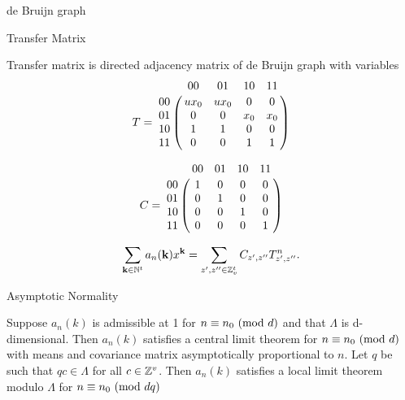   \begin{frame}{de Bruijn graph}
    \usetikzlibrary {arrows.meta}
    \begin{center}
    \end{center}

  \end{frame}

  \begin{frame}{Transfer Matrix}


    
    Transfer matrix is directed adjacency matrix of de Bruijn graph with variables
    \[
      T =  \bordermatrix{ & 00 & 01 & 10 & 11 \cr
     00 & ux_0 & ux_0 & 0 & 0 \cr
     01 & 0 & 0 & x_0 & x_0 \cr
     10 & 1 & 1 & 0 & 0\cr
   11 & 0 & 0 & 1 & 1}
      \]

\[
      C =  \bordermatrix{ & 00 & 01 & 10 & 11 \cr
     00 & 1 & 0 & 0 & 0 \cr
     01 & 0 & 1 & 0 & 0 \cr
     10 & 0 & 0 & 1 & 0\cr
   11 & 0 & 0 & 0 & 1}
      \]

\[
  \sum_{\mathbf{k} \in \mathbb{N}^t} a_n({\mathbf k})x^{\mathbf k} = \sum_{z',z'' \in \mathbb{Z}_v^t} C_{z',z''} T^{n}_{z',z''}.
\]
      
\end{frame}


\begin{frame}{Asymptotic Normality}

  \begin{theorem} 
Suppose $a_n(k)$ is admissible at 1 for $n \equiv n_0 \ (\mathrm{mod}\ d)$ and that 
$\Lambda$ is d-dimensional. Then $a_n(k)$ satisfies a central limit theorem 
for $n \equiv n_0 \ (\mathrm{mod}\ d)$ with means and covariance matrix asymptotically 
proportional to $n$.  Let $q$ be such that $qc \in \Lambda$ for all 
$c \in \mathbb{Z}^v$.  Then $a_n(k)$ satisfies a local limit theorem modulo 
$\Lambda$ for $n \equiv n_0 \ (\mathrm{mod}\ dq)$
\end{theorem}
  
\end{frame}

